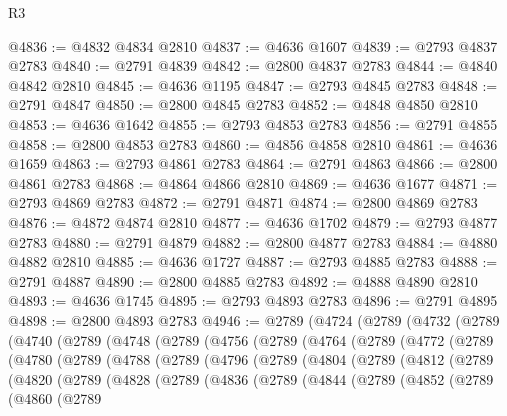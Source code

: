 \begin{lexlean}{R3}
\begin{coremodule}
@4836 := @4832 @4834 @2810
@4837 := @4636 @1607
@4839 := @2793 @4837 @2783
@4840 := @2791 @4839
@4842 := @2800 @4837 @2783
@4844 := @4840 @4842 @2810
@4845 := @4636 @1195
@4847 := @2793 @4845 @2783
@4848 := @2791 @4847
@4850 := @2800 @4845 @2783
@4852 := @4848 @4850 @2810
@4853 := @4636 @1642
@4855 := @2793 @4853 @2783
@4856 := @2791 @4855
@4858 := @2800 @4853 @2783
@4860 := @4856 @4858 @2810
@4861 := @4636 @1659
@4863 := @2793 @4861 @2783
@4864 := @2791 @4863
@4866 := @2800 @4861 @2783
@4868 := @4864 @4866 @2810
@4869 := @4636 @1677
@4871 := @2793 @4869 @2783
@4872 := @2791 @4871
@4874 := @2800 @4869 @2783
@4876 := @4872 @4874 @2810
@4877 := @4636 @1702
@4879 := @2793 @4877 @2783
@4880 := @2791 @4879
@4882 := @2800 @4877 @2783
@4884 := @4880 @4882 @2810
@4885 := @4636 @1727
@4887 := @2793 @4885 @2783
@4888 := @2791 @4887
@4890 := @2800 @4885 @2783
@4892 := @4888 @4890 @2810
@4893 := @4636 @1745
@4895 := @2793 @4893 @2783
@4896 := @2791 @4895
@4898 := @2800 @4893 @2783
@4946 := @2789
    (@4724
      (@2789
        (@4732
          (@2789
            (@4740
              (@2789
                (@4748
                  (@2789
                    (@4756
                      (@2789
                        (@4764
                          (@2789
                            (@4772
                              (@2789
                                (@4780
                                  (@2789
                                    (@4788
                                      (@2789
                                        (@4796
                                          (@2789
                                            (@4804
                                              (@2789
                                                (@4812
                                                  (@2789
                                                    (@4820
                                                      (@2789
                                                        (@4828
                                                          (@2789
                                                            (@4836
                                                              (@2789
                                                                (@4844
                                                                  (@2789
                                                                    (@4852
                                                                      (@2789
                                                                        (@4860
                                                                          (@2789

\end{coremodule}
\end{lexlean}
